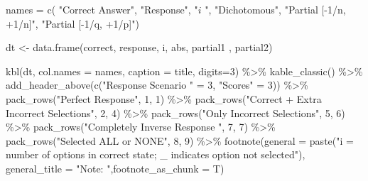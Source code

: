 \documentclass[
  letterpaper,
  DIV=11,
  numbers=noendperiod]{scrreprt}
\newenvironment{Shaded}{\begin{snugshade}}{\end{snugshade}}
\newcommand{\AttributeTok}[1]{\textcolor[rgb]{0.40,0.45,0.13}{#1}}
\newcommand{\DecValTok}[1]{\textcolor[rgb]{0.68,0.00,0.00}{#1}}
\newcommand{\FunctionTok}[1]{\textcolor[rgb]{0.28,0.35,0.67}{#1}}
\newcommand{\NormalTok}[1]{\textcolor[rgb]{0.00,0.23,0.31}{#1}}
\newcommand{\OtherTok}[1]{\textcolor[rgb]{0.00,0.23,0.31}{#1}}
\newcommand{\SpecialCharTok}[1]{\textcolor[rgb]{0.37,0.37,0.37}{#1}}
\newcommand{\StringTok}[1]{\textcolor[rgb]{0.13,0.47,0.30}{#1}}
\begin{document}
\begin{Shaded}
\begin{Highlighting}[]
\NormalTok{names }\OtherTok{=} \FunctionTok{c}\NormalTok{(    }\StringTok{"Correct Answer"}\NormalTok{,}
              \StringTok{"Response"}\NormalTok{,}
              \StringTok{"$i$ "}\NormalTok{,}
              \StringTok{"Dichotomous"}\NormalTok{,}
              \StringTok{"Partial [{-}1/n, +1/n]"}\NormalTok{,}
              \StringTok{"Partial [{-}1/q, +1/p]"}\NormalTok{)}

\NormalTok{dt }\OtherTok{\textless{}{-}} \FunctionTok{data.frame}\NormalTok{(correct, response, i, abs, partial1 , partial2)}

\FunctionTok{kbl}\NormalTok{(dt, }\AttributeTok{col.names =}\NormalTok{ names, }\AttributeTok{caption =}\NormalTok{ title, }\AttributeTok{digits=}\DecValTok{3}\NormalTok{) }\SpecialCharTok{\%\textgreater{}\%}
  \FunctionTok{kable\_classic}\NormalTok{() }\SpecialCharTok{\%\textgreater{}\%}
    \FunctionTok{add\_header\_above}\NormalTok{(}\FunctionTok{c}\NormalTok{(}\StringTok{"Response Scenario "} \OtherTok{=} \DecValTok{3}\NormalTok{, }\StringTok{"Scores"} \OtherTok{=} \DecValTok{3}\NormalTok{)) }\SpecialCharTok{\%\textgreater{}\%} 
    \FunctionTok{pack\_rows}\NormalTok{(}\StringTok{"Perfect Response"}\NormalTok{, }\DecValTok{1}\NormalTok{, }\DecValTok{1}\NormalTok{) }\SpecialCharTok{\%\textgreater{}\%}
    \FunctionTok{pack\_rows}\NormalTok{(}\StringTok{"Correct + Extra Incorrect Selections"}\NormalTok{, }\DecValTok{2}\NormalTok{, }\DecValTok{4}\NormalTok{) }\SpecialCharTok{\%\textgreater{}\%}
    \FunctionTok{pack\_rows}\NormalTok{(}\StringTok{"Only Incorrect Selections"}\NormalTok{, }\DecValTok{5}\NormalTok{, }\DecValTok{6}\NormalTok{) }\SpecialCharTok{\%\textgreater{}\%}
    \FunctionTok{pack\_rows}\NormalTok{(}\StringTok{"Completely Inverse Response "}\NormalTok{, }\DecValTok{7}\NormalTok{, }\DecValTok{7}\NormalTok{) }\SpecialCharTok{\%\textgreater{}\%}
    \FunctionTok{pack\_rows}\NormalTok{(}\StringTok{"Selected ALL or NONE"}\NormalTok{, }\DecValTok{8}\NormalTok{, }\DecValTok{9}\NormalTok{) }\SpecialCharTok{\%\textgreater{}\%}
    \FunctionTok{footnote}\NormalTok{(}\AttributeTok{general =} \FunctionTok{paste}\NormalTok{(}\StringTok{"i = number of options in correct state; \_ indicates option not selected"}\NormalTok{),}
           \AttributeTok{general\_title =} \StringTok{"Note: "}\NormalTok{,}\AttributeTok{footnote\_as\_chunk =}\NormalTok{ T)}
\end{Highlighting}
\end{Shaded}
\end{document}
